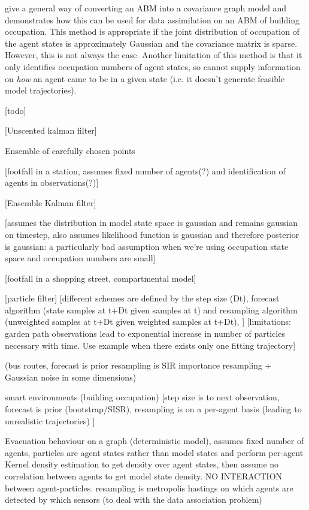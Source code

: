\documentclass{article}
\begin{document}
\citet{liao2010integrated} give a general way of converting an ABM into a covariance graph model and demonstrates how this can be used for data assimilation on an ABM of building occupation. This method is appropriate if the joint distribution of occupation of the agent states is approximately Gaussian and the covariance matrix is sparse. However, this is not always the case. Another limitation of this method is that it only identifies occupation numbers of agent states, so cannot supply information on \textit{how} an agent came to be in a given state (i.e. it doesn't generate feasible model trajectories).

[todo]


[Unscented kalman filter]

Ensemble of carefully chosen points

\cite{clay_realtime_2020} [footfall in a station, assumes fixed number of agents(?) and identification of agents in observations(?)]

[Ensemble Kalman filter]

[assumes the distribution in model state space is gaussian and remains gaussian on timestep, also assumes likelihood function is gaussian and therefore posterior is gaussian: a particularly bad assumption when we're using occupation state space and occupation numbers are small]

\cite{ward_dynamic_2016} [footfall in a shopping street, compartmental model]

[particle filter]
[different schemes are defined by the step size (Dt), forecast algorithm (state samples at t+Dt given samples at t) and resampling algorithm (unweighted samples at t+Dt given weighted samples at t+Dt), ]
[limitations: garden path observations lead to exponential increase in number of particles necessary with time. Use example when there exists only one fitting trajectory]

\citet{kieu_dealing_2020} (bus routes, forecast is prior resampling is SIR importance resampling + Gaussian noise in some dimensions)

smart environments (building occupation) \cite{wang_data_2015} [step size is to next observation, forecast is prior (bootstrap/SISR), resampling is on a per-agent basis (leading to unrealistic trajectories) ]


\cite{lueck_who_2019} Evacuation behaviour on a graph (deterministic model), assumes fixed number of agents, particles are agent states rather than model states and perform per-agent Kernel density estimation to get density over agent states, then assume no correlation between agents to get model state density. NO INTERACTION between agent-particles. resampling is metropolis hastings on which agents are detected by which sensors (to deal with the data association problem)
\end{document}
